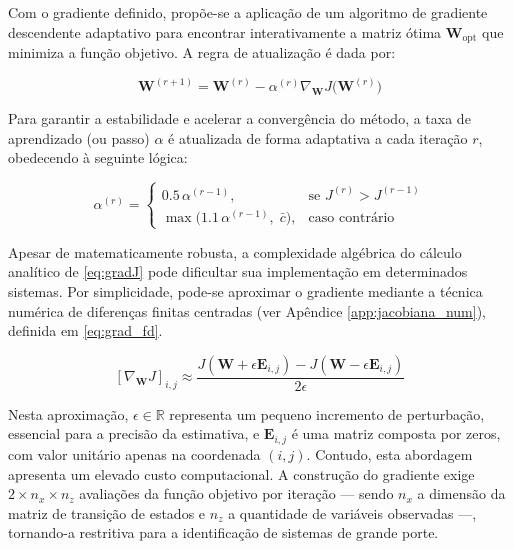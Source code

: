 \documentclass[journal]{IEEEtran}
\begin{document}
Com o gradiente definido, propõe-se a aplicação de um algoritmo de gradiente descendente adaptativo para encontrar interativamente a matriz ótima $\mathbf{W}_{\text{opt}}$ que minimiza a função objetivo. A regra de atualização é dada por:

\begin{equation}
    \label{eq:gradDesc}
    \mathbf{W}^{(r+1)} = \mathbf{W}^{(r)} - \alpha^{(r)} \nabla_{\mathbf{W}} J\big(\mathbf{W}^{(r)}\big) 
\end{equation}

Para garantir a estabilidade e acelerar a convergência do método, a taxa de aprendizado (ou passo) $\alpha$ é atualizada de forma adaptativa a cada iteração $r$, obedecendo à seguinte lógica:

\begin{equation}
    \label{eq:alphaValues}
    \alpha^{(r)} = \begin{cases}
    0.5\,\alpha^{(r-1)}, & \text{se } J^{(r)} > J^{(r-1)} \\[4pt]
    \max\big(1.1\,\alpha^{(r-1)},\; \bar{c}\big), & \text{caso contrário}
    \end{cases}
\end{equation}

Apesar de matematicamente robusta, a complexidade algébrica do cálculo analítico de \eqref{eq:gradJ} pode dificultar sua implementação em determinados sistemas. Por simplicidade, pode-se aproximar o gradiente mediante a técnica numérica de diferenças finitas centradas (ver Apêndice \ref{app:jacobiana_num}), definida em \eqref{eq:grad_fd}.

\begin{equation}
    \label{eq:grad_fd}
    [\nabla_{\mathbf{W}} J]_{i,j} \approx \frac{J(\mathbf{W} + \epsilon \mathbf{E}_{i,j}) - J(\mathbf{W} - \epsilon \mathbf{E}_{i,j})}{2\epsilon}
\end{equation}

Nesta aproximação, $\epsilon \in \mathbb{R}$ representa um pequeno incremento de perturbação, essencial para a precisão da estimativa, e $\mathbf{E}_{i,j}$ é uma matriz composta por zeros, com valor unitário apenas na coordenada $(i,j)$. Contudo, esta abordagem apresenta um elevado custo computacional. A construção do gradiente exige $2\times n_x \times n_z$ avaliações da função objetivo por iteração — sendo $n_x$ a dimensão da matriz de transição de estados e $n_z$ a quantidade de variáveis observadas —, tornando-a restritiva para a identificação de sistemas de grande porte.
\end{document}
